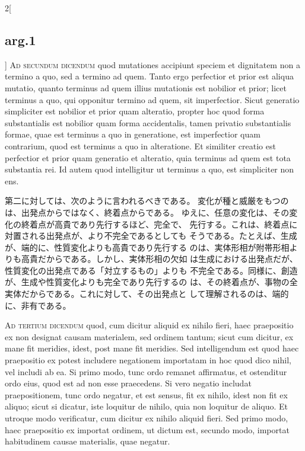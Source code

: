 \documentclass[paper=a4paper,fontsize=10pt,jafontsize=9pt,titlepage]{jlreq}
\begin{document}
\begin{paracol}{2}[\subsection{arg.1}]
{\scshape Ad secundum dicendum} quod mutationes
 accipiunt speciem et dignitatem non a termino a quo, sed a termino ad
 quem. Tanto ergo perfectior et prior est aliqua mutatio, quanto
 terminus ad quem illius mutationis est nobilior et prior; licet
 terminus a quo, qui opponitur termino ad quem, sit imperfectior. Sicut
 generatio simpliciter est nobilior et prior quam alteratio, propter hoc
 quod forma substantialis est nobilior quam forma accidentalis, tamen
 privatio substantialis formae, quae est terminus a quo in generatione,
 est imperfectior quam contrarium, quod est terminus a quo in
 alteratione. Et similiter creatio est perfectior et prior quam
 generatio et alteratio, quia terminus ad quem est tota substantia
 rei. Id autem quod intelligitur ut terminus a quo, est simpliciter non
 ens.

\switchcolumn

第二に対しては、次のように言われるべきである。
変化が種と威厳をもつのは、出発点からではなく、終着点からである。
ゆえに、任意の変化は、その変化の終着点が高貴であり先行するほど、完全で、
 先行する。これは、終着点に対置される出発点が、より不完全であるとしても
 そうである。たとえば、生成が、端的に、性質変化よりも高貴であり先行する
 のは、実体形相が附帯形相よりも高貴だからである。しかし、実体形相の欠如
 は生成における出発点だが、性質変化の出発点である「対立するもの」よりも
 不完全である。同様に、創造が、生成や性質変化よりも完全であり先行するの
 は、その終着点が、事物の全実体だからである。これに対して、その出発点と
 して理解されるのは、端的に、非有である。

\switchcolumn*[\subsection{ad.3}]

{\scshape Ad tertium dicendum} quod, cum dicitur aliquid
 ex nihilo fieri, haec praepositio ex non designat causam materialem,
 sed ordinem tantum; sicut cum dicitur, ex mane fit meridies, idest,
 post mane fit meridies. Sed intelligendum est quod haec praepositio ex
 potest includere negationem importatam in hoc quod dico nihil, vel
 includi ab ea. Si primo modo, tunc ordo remanet affirmatus, et
 ostenditur ordo eius, quod est ad non esse praecedens. Si vero negatio
 includat praepositionem, tunc ordo negatur, et est sensus, fit ex
 nihilo, idest non fit ex aliquo; sicut si dicatur, iste loquitur de
 nihilo, quia non loquitur de aliquo. Et utroque modo verificatur, cum
 dicitur ex nihilo aliquid fieri. Sed primo modo, haec praepositio ex
 importat ordinem, ut dictum est, secundo modo, importat habitudinem
 causae materialis, quae negatur.


\end{paracol}
\end{document}
